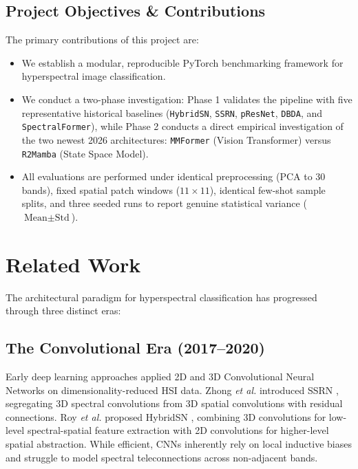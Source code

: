 \documentclass[conference]{IEEEtran}
\begin{document}
\subsection{Project Objectives \& Contributions}
The primary contributions of this project are:
\begin{itemize}
    \item We establish a modular, reproducible PyTorch benchmarking framework for hyperspectral image classification.
    \item We conduct a two-phase investigation: Phase 1 validates the pipeline with five representative historical baselines (\texttt{HybridSN}, \texttt{SSRN}, \texttt{pResNet}, \texttt{DBDA}, and \texttt{SpectralFormer}), while Phase 2 conducts a direct empirical investigation of the two newest 2026 architectures: \texttt{MMFormer} (Vision Transformer) versus \texttt{R2Mamba} (State Space Model).
    \item All evaluations are performed under identical preprocessing (PCA to 30 bands), fixed spatial patch windows ($11 \times 11$), identical few-shot sample splits, and three seeded runs to report genuine statistical variance ($\text{Mean} \pm \text{Std}$).
\end{itemize}

\section{Related Work}
The architectural paradigm for hyperspectral classification has progressed through three distinct eras:

\subsection{The Convolutional Era (2017--2020)}
Early deep learning approaches applied 2D and 3D Convolutional Neural Networks on dimensionality-reduced HSI data. Zhong \textit{et al.} introduced SSRN \cite{ssrn}, segregating 3D spectral convolutions from 3D spatial convolutions with residual connections. Roy \textit{et al.} proposed HybridSN \cite{hybridsn}, combining 3D convolutions for low-level spectral-spatial feature extraction with 2D convolutions for higher-level spatial abstraction. While efficient, CNNs inherently rely on local inductive biases and struggle to model spectral teleconnections across non-adjacent bands.
\end{document}
